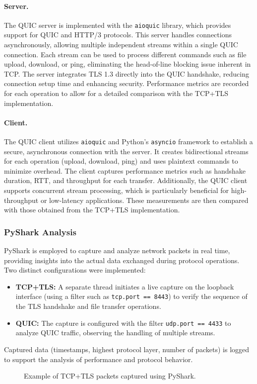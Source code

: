 \paragraph{Server.} The QUIC server is implemented with the \texttt{aioquic} library, which provides support for QUIC and HTTP/3 protocols. This server handles connections asynchronously, allowing multiple independent streams within a single QUIC connection. Each stream can be used to process different commands such as file upload, download, or ping, eliminating the head-of-line blocking issue inherent in TCP. The server integrates TLS 1.3 directly into the QUIC handshake, reducing connection setup time and enhancing security. Performance metrics are recorded for each operation to allow for a detailed comparison with the TCP+TLS implementation.

\paragraph{Client.} The QUIC client utilizes \texttt{aioquic} and Python's \texttt{asyncio} framework to establish a secure, asynchronous connection with the server. It creates bidirectional streams for each operation (upload, download, ping) and uses plaintext commands to minimize overhead. The client captures performance metrics such as handshake duration, RTT, and throughput for each transfer. Additionally, the QUIC client supports concurrent stream processing, which is particularly beneficial for high-throughput or low-latency applications. These measurements are then compared with those obtained from the TCP+TLS implementation.

\subsubsection{PyShark Analysis}
PyShark is employed to capture and analyze network packets in real time, providing insights into the actual data exchanged during protocol operations. Two distinct configurations were implemented:

\begin{itemize}
\item \textbf{TCP+TLS:} A separate thread initiates a live capture on the loopback interface (using a filter such as \texttt{tcp.port == 8443}) to verify the sequence of the TLS handshake and file transfer operations.

\item \textbf{QUIC:} The capture is configured with the filter \texttt{udp.port == 4433} to analyze QUIC traffic, observing the handling of multiple streams.
\end{itemize}

Captured data (timestamps, highest protocol layer, number of packets) is logged to support the analysis of performance and protocol behavior.

\begin{figure}[h]
	\centering
	\caption{Example of TCP+TLS packets captured using PyShark.}
\end{figure}